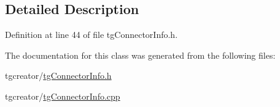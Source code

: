 \subsection{Detailed Description}


Definition at line 44 of file tg\-Connector\-Info.\-h.



The documentation for this class was generated from the following files\-:\begin{DoxyCompactItemize}
\item 
tgcreator/\hyperlink{tg_connector_info_8h}{tg\-Connector\-Info.\-h}\item 
tgcreator/\hyperlink{tg_connector_info_8cpp}{tg\-Connector\-Info.\-cpp}\end{DoxyCompactItemize}
